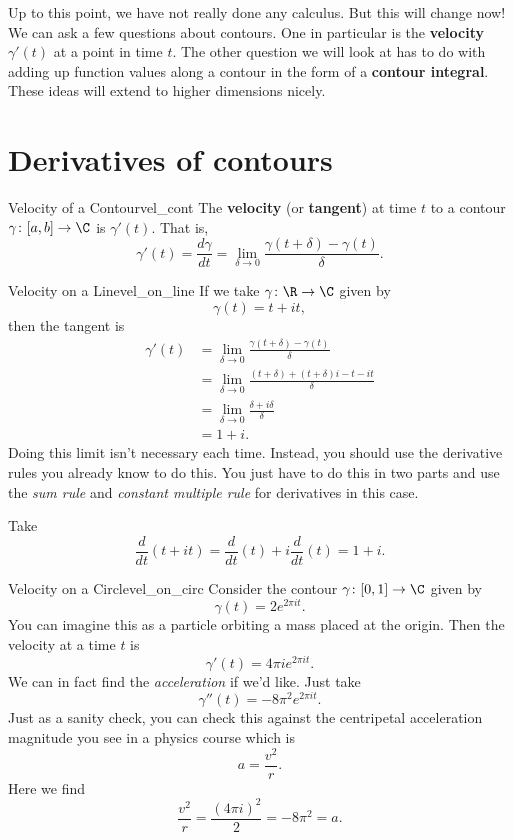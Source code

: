         Up to this point, we have not really done any calculus.  But this will change now! We can ask a few questions about contours.  One in particular is the \textbf{velocity} $\gamma'(t)$ at a point in time $t$.  The other question we will look at has to do with adding up function values along a contour in the form of a \textbf{contour integral}.  These ideas will extend to higher dimensions nicely.  
        
        \section{Derivatives of contours}
        
        \begin{df}{Velocity of a Contour}{vel_cont}
        The \textbf{velocity} (or \textbf{tangent}) at time $t$ to a contour $\gamma \colon [a,b] \to \C$ is $\gamma'(t)$. That is,
        \[
        \gamma'(t)=\frac{d\gamma}{dt}=\lim_{\delta\to 0} \frac{\gamma(t+\delta)-\gamma(t)}{\delta}.
        \]
        \end{df}
        
        \begin{ex}{Velocity on a Line}{vel_on_line}
        If we take $\gamma \colon \R \to \C$ given by
        \[
        \gamma(t)=t+it,
        \]
        then the tangent is
        \begin{align*}
        \gamma'(t)&=\lim_{\delta \to 0} \frac{\gamma(t+\delta)-\gamma(t)}{\delta}\\
        &=\lim_{\delta \to 0} \frac{(t+\delta)+(t+\delta)i-t-it}{\delta}\\
        &= \lim_{\delta \to 0} \frac{\delta + i\delta}{\delta}\\
        &= 1+i.
        \end{align*}
        Doing this limit isn't necessary each time.  Instead, you should use the derivative rules you already know to do this.  You just have to do this in two parts and use the \emph{sum rule} and \emph{constant multiple rule} for derivatives in this case. 
        
        Take
        \[
        \frac{d}{dt}(t+it)=\frac{d}{dt}(t)+i\frac{d}{dt}(t)=1+i.
        \]
        \end{ex}
        
        \begin{ex}{Velocity on a Circle}{vel_on_circ}
        Consider the contour $\gamma \colon [0,1] \to \C$ given by
        \[
        \gamma(t)=2e^{2\pi i t}.
        \]
        You can imagine this as a particle orbiting a mass placed at the origin.  Then the velocity at a time $t$ is
        \[
        \gamma'(t)=4\pi i e^{2\pi i t}. 
        \]
        We can in fact find the \emph{acceleration} if we'd like.  Just take
        \[
        \gamma''(t)=-8\pi^2 e^{2\pi i t}.
        \]
        Just as a sanity check, you can check this against the centripetal acceleration magnitude you see in a physics course which is
        \[
        a=\frac{v^2}{r}.
        \]
        Here we find
        \[
        \frac{v^2}{r}=\frac{(4\pi i )^2}{2}=-8\pi^2=a.
        \]
        \end{ex}
        
